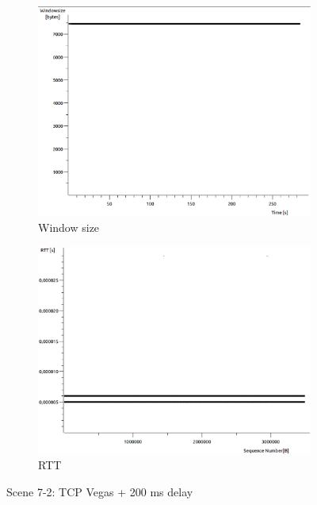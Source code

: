 \documentclass[conference,a4paper]{../../sty/IEEEtran}
\begin{document}
\begin{figure}
\begin{subfigure}[b]{0.2\textwidth}
  \includegraphics[width=\textwidth]{s7-2_wsize}
  \caption{Window size}
 \end{subfigure}
 \begin{subfigure}[b]{0.2\textwidth}
  \includegraphics[width=\textwidth]{s7-2_rtt}
  \caption{RTT}
 \end{subfigure}
 \caption{Scene 7-2: TCP Vegas + 200 ms delay}
\end{figure}
\end{document}
